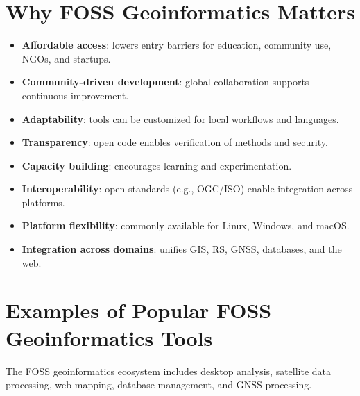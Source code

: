 \documentclass[
  11pt,
  letterpaper,
]{book}
\providecommand{\tightlist}{%
  \setlength{\itemsep}{0pt}\setlength{\parskip}{0pt}}
\begin{document}
\section{Why FOSS Geoinformatics
Matters}\label{why-foss-geoinformatics-matters}

\begin{itemize}
\tightlist
\item
  \textbf{Affordable access}: lowers entry barriers for education,
  community use, NGOs, and startups.\\
\item
  \textbf{Community-driven development}: global collaboration supports
  continuous improvement.\\
\item
  \textbf{Adaptability}: tools can be customized for local workflows and
  languages.\\
\item
  \textbf{Transparency}: open code enables verification of methods and
  security.\\
\item
  \textbf{Capacity building}: encourages learning and experimentation.\\
\item
  \textbf{Interoperability}: open standards (e.g., OGC/ISO) enable
  integration across platforms.\\
\item
  \textbf{Platform flexibility}: commonly available for Linux, Windows,
  and macOS.\\
\item
  \textbf{Integration across domains}: unifies GIS, RS, GNSS, databases,
  and the web.
\end{itemize}

\section{Examples of Popular FOSS Geoinformatics
Tools}\label{examples-of-popular-foss-geoinformatics-tools}

The FOSS geoinformatics ecosystem includes desktop analysis, satellite
data processing, web mapping, database management, and GNSS processing.
\end{document}
